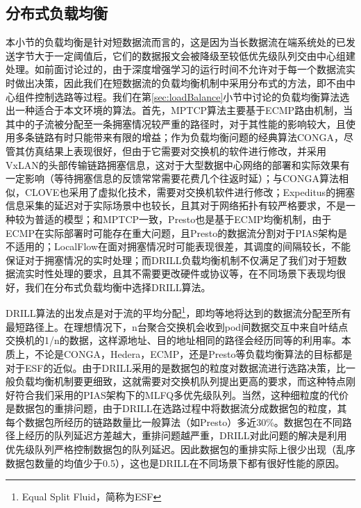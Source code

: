 \subsection{分布式负载均衡}
本小节的负载均衡是针对短数据流而言的，这是因为当长数据流在端系统处的已发送字节大于一定阈值后，它们的数据报文会被降级至较低优先级队列交由中心组建处理。如前面讨论过的，由于深度增强学习的运行时间不允许对于每一个数据流实时做出决策，因此我们在短数据流的负载均衡机制中采用分布式的方法，即不由中心组件控制选路等过程。我们在第\ref{sec:loadBalance}小节中讨论的负载均衡算法选出一种适合于本文环境的算法。首先，MPTCP算法主要基于ECMP路由机制，当其中的子流被分配至一条拥塞情况较严重的路径时，对于其性能的影响较大，且使用多条链路有时只能带来有限的增益；作为负载均衡问题的经典算法CONGA，尽管其仿真结果上表现很好，但由于它需要对交换机的软件进行修改，并采用VxLAN的头部传输链路拥塞信息，这对于大型数据中心网络的部署和实际效果有一定影响（等待拥塞信息的反馈常常需要花费几个往返时延）；与CONGA算法相似，CLOVE也采用了虚拟化技术，需要对交换机软件进行修改；Expeditus的拥塞信息采集的延迟对于实际场景中也较长，且其对于网络拓扑有较严格要求，不是一种较为普适的模型；和MPTCP一致，Presto也是基于ECMP均衡机制，由于ECMP在实际部署时可能存在重大问题，且Presto的数据流分割对于PIAS架构是不适用的；LocalFlow在面对拥塞情况时可能表现很差，其调度的间隔较长，不能保证对于拥塞情况的实时处理；而DRILL负载均衡机制不仅满足了我们对于短数据流实时性处理的要求，且其不需要更改硬件或协议等，在不同场景下表现均很好，我们在分布式负载均衡中选择DRILL算法。

DRILL算法的出发点是对于流的平均分配\footnote{Equal Split Fluid，简称为ESF}，即均等地将达到的数据流分配至所有最短路径上。在理想情况下，n台聚合交换机会收到pod间数据交互中来自叶结点交换机的1/n的数据，这样源地址、目的地址相同的路径会经历同等的利用率。本质上，不论是CONGA，Hedera，ECMP，还是Presto等负载均衡算法的目标都是对于ESF的近似。由于DRILL采用的是数据包的粒度对数据流进行选路决策，比一般负载均衡机制要更细致，这就需要对交换机队列提出更高的要求，而这种特点刚好符合我们采用的PIAS架构下的MLFQ多优先级队列。当然，这种细粒度的代价是数据包的重排问题，由于DRILL在选路过程中将数据流分成数据包的粒度，其每个数据包所经历的链路数量比一般算法（如Presto）多近30\%。数据包在不同路径上经历的队列延迟方差越大，重排问题越严重，DRILL对此问题的解决是利用优先级队列严格控制数据包的队列延迟。因此数据包的重排实际上很少出现（乱序数据包数量的均值少于0.5），这也是DRILL在不同场景下都有很好性能的原因。

